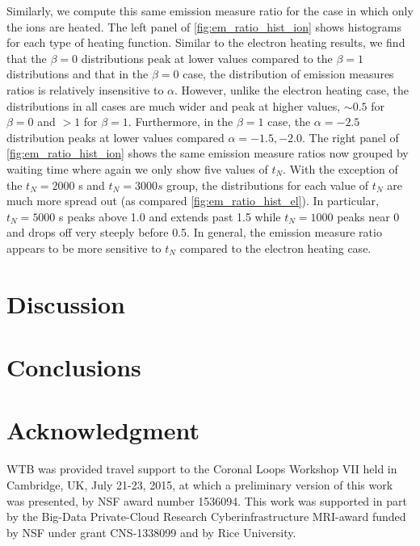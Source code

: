 \documentclass[apj]{emulateapj}
\begin{document}
	\par Similarly, we compute this same emission measure ratio for the case in which only the ions are heated. The left panel of \autoref{fig:em_ratio_hist_ion} shows histograms for each type of heating function. Similar to the electron heating results, we find that the $\beta=0$ distributions peak at lower values compared to the $\beta=1$ distributions and that in the $\beta=0$ case, the distribution of emission measures ratios is relatively insensitive to $\alpha$. However, unlike the electron heating case, the distributions in all cases are much wider and peak at higher values, $\sim0.5$ for $\beta=0$ and $>1$ for $\beta=1$. Furthermore, in the $\beta=1$ case, the $\alpha=-2.5$ distribution peaks at lower values compared $\alpha=-1.5,-2.0$. The right panel of \autoref{fig:em_ratio_hist_ion} shows the same emission measure ratios now grouped by waiting time where again we only show five values of $t_N$. With the exception of the $t_N=2000$ s and $t_N=3000 s$ group, the distributions for each value of $t_N$ are much more spread out (as compared \autoref{fig:em_ratio_hist_el}). In particular, $t_N=5000$ s peaks above 1.0 and extends past 1.5 while $t_N=1000$ peaks near 0 and drops off very steeply before 0.5. In general, the emission measure ratio appears to be more sensitive to $t_N$ compared to the electron heating case.
	\section{Discussion}
	\label{sec:discussion}
	\section{Conclusions}
	\label{sec:conclusions}
	\section*{Acknowledgment}
	WTB was provided travel support to the Coronal Loops Workshop VII held in Cambridge, UK, July 21-23, 2015, at which a preliminary version of this work was presented, by NSF award number 1536094. This work was supported in part by the Big-Data Private-Cloud Research Cyberinfrastructure MRI-award funded by NSF under grant CNS-1338099 and by Rice University.
	
	
	\clearpage
\end{document}

